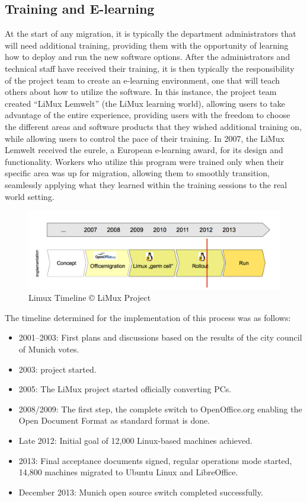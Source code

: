 \subsection{Training and  E-learning }
At the start of any migration, it is typically the department administrators that will need additional training, providing them with the opportunity of learning how to deploy and run the new software options. After the administrators and technical staff have received their training, it is then typically the responsibility of the project team to create an e-learning environment, one that will teach others about how to utilize the software. In this instance, the project team created “LiMux Lemwelt” (the LiMux learning world), allowing users to take advantage of the entire experience, providing users with the freedom to choose the different areas and software products that they wished additional training on, while allowing users to control the pace of their training. In 2007, the LiMux Lemwelt received the eurele, a European e-learning award, for its design and functionality. Workers who utilize this program were trained only when their specific area was up for migration, allowing them to smoothly transition, seamlessly applying what they learned within the training sessions to the real world setting.
\begin{figure}[H]
    \includegraphics[scale=0.4]{img/timeline_limux.png}
 \caption  [Limux Timeline]{Limux Timeline © LiMux Project}  
\end{figure}
The timeline determined for the implementation of this process was as follows:
\begin{itemize}
\subsection{Timeline}

\item 2001–2003: First plans and discussions based on the results of the city council of Munich votes.
\item 2003: project started.
\item 2005: The LiMux project started officially converting PCs.
\item 2008/2009: The first step, the complete switch to OpenOffice.org enabling the Open Document Format as standard format is done.
\item Late 2012: Initial goal of 12,000 Linux-based machines achieved.
\item  2013: Final acceptance documents signed, regular operations mode started, 14,800 machines migrated to Ubuntu Linux and LibreOffice.
\item December 2013: Munich open source switch completed successfully.

\end{itemize}
